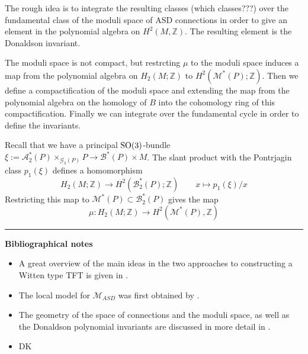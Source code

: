 The rough idea is to integrate the resulting classes (which classes???) over the
fundamental class of the moduli space of ASD connections in order to give an
element in the polynomial algebra on  $H^2(M,\mathbb{Z})$. The resulting element
is the Donaldson invariant. 

The moduli space is not compact, but restrcting $\mu$ to the moduli space
induces a map from the polynomial algebra on  $H_2(M;\mathbb{Z})$ to
$H^2(\mathcal{M}^*(P);\mathbb{Z})$. Then we define a compactification of the
moduli space and extending the map from the polynomial algebra on the homology
of $B$ into the cohomology ring of this compactification. Finally we can
integrate over the fundamental cycle in order to define the invariants.


Recall that we have a principal $\operatorname{SO}(3)$-bundle  $\xi:=\mathcal{A}_2^*(P)\times
_{\mathcal{G}_3(P)} P \to \mathcal{B}^*(P) \times M$. 
The slant product with the Pontrjagin class $p_1(\xi)$ defines a homomorphism 
\[
H_2(M;\mathbb{Z}) \to H^2(\mathcal{B}_2^*(P);\mathbb{Z})
\qquad x\mapsto p_1(\xi)/ x
\] 
Restricting this map to $\mathcal{M}^*(P) \subset \mathcal{B}_2^*(P)$ gives the
map 
\[
\mu : H_2(M;\mathbb{Z}) \to H^2(\mathcal{M}^*(P),\mathbb{Z})
\]


\vspace{5mm}
\hrule 
\vspace{5mm}



\textbf{Bibliographical notes}
{\small
\begin{itemize}
	\item A great overview of the main ideas in the two approaches to
		constructing a Witten type TFT is given in \citet{TQFTbook}.
	\item The local model for $\mathcal{M}_{ASD}$ was first obtained by 
		\citet{local_moduli}.
	\item The geometry of the space of connections and the moduli space, 
		as well as the Donaldson polynomial invariants are
		discussed in more detail in \citet{morgan}. 
	\item DK
\end{itemize}
}
